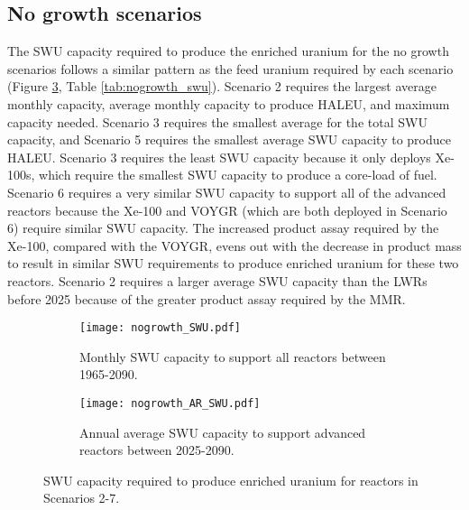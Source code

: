 \subsection{No growth scenarios} \label{sec:nogrowth_swu}
The \gls{SWU} capacity required to produce the enriched uranium for 
the no growth scenarios follows a similar pattern as 
the feed uranium required by each scenario (Figure \ref{fig:nogrowth_swu}, 
Table \ref{tab:nogrowth_swu}). Scenario 2 requires the largest average 
monthly capacity, average monthly capacity to produce \gls{HALEU}, and maximum 
capacity needed. Scenario 3 requires the smallest average for the total 
\gls{SWU} capacity, 
and Scenario 5 requires the smallest average 
\gls{SWU} capacity to produce \gls{HALEU}. Scenario 3 requires the least 
\gls{SWU} capacity because it only deploys Xe-100s, which require the 
smallest \gls{SWU} capacity to produce a core-load of fuel. Scenario 
6 requires a very similar \gls{SWU} capacity to support all of the 
advanced reactors because the Xe-100 and VOYGR (which are both deployed 
in Scenario 6) require similar \gls{SWU} capacity. The increased 
product assay required by the Xe-100, compared with the VOYGR, evens 
out with the decrease in product mass to result in similar \gls{SWU} 
requirements to produce enriched uranium for these two reactors. 
Scenario 2 requires a larger average \gls{SWU} capacity 
than the \glspl{LWR} before 2025 because of the greater product 
assay required by the \gls{MMR}. 

\begin{figure}[h!]
    \centering
    \begin{subfigure}[b]{0.45\textwidth}
        \centering
        \texttt{[image: nogrowth\_SWU.pdf]}
        \caption{Monthly \gls{SWU} capacity to support all reactors between 1965-2090.}
        \label{fig:nogrowth_all_SWU}
    \end{subfigure}
    \hfill
    \begin{subfigure}[b]{0.45\textwidth}
        \centering
        \texttt{[image: nogrowth\_AR\_SWU.pdf]}
        \caption{Annual average \gls{SWU} capacity to support advanced reactors between 2025-2090.}
        \label{fig:nogrowth_AR_SWU}
    \end{subfigure}
       \caption{\gls{SWU} capacity required to produce enriched uranium 
       for reactors in Scenarios 2-7.}
       \label{fig:nogrowth_swu}
\end{figure}


